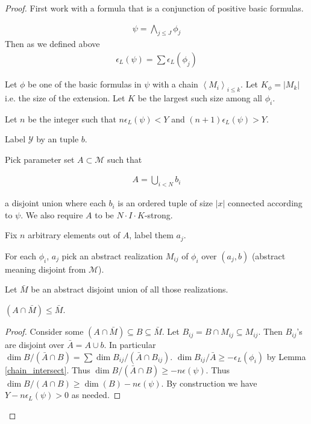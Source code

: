 \documentclass{amsart}
\newcommand{\MM}{\mathscr M}
\newcommand{\Y}{\mathcal Y}
\newcommand{\agl}[1]{\left\langle #1 \right\rangle}
\begin{document}
\begin{proof}
	First work with a formula that is a conjunction of positive basic formulas.

	\begin{align*}
		\psi = \bigwedge_{j \leq J} \phi_j
	\end{align*}
	Then as we defined above
	\begin{align*}
		\epsilon_L(\psi) = \sum \epsilon_L(\phi_j)
	\end{align*}
	
	Let $\phi$ be one of the basic formulas in $\psi$ with a chain $\agl{M_i}_{i \leq k}$.
	Let $K_\phi = |M_k|$ i.e. the size of the extension.
	Let $K$ be the largest such size among all $\phi_i$.

	Let $n$ be the integer such that $n \epsilon_L(\psi) < Y$ and $(n+1) \epsilon_L(\psi) > Y$.

	Label $\Y$ by an tuple $b$.

	Pick parameter set $A \subset \MM$ such that 

	\begin{align*}
		A = \bigcup_{i<N} b_i
	\end{align*}

	a disjoint union where each $b_i$ is an ordered tuple of size $|x|$ connected according to $\psi$.
	We also require $A$ to be $N \cdot I \cdot K$-strong.

	Fix $n$ arbitrary elements out of $A$, label them $a_j$.

	For each $\phi_i$, $a_j$ pick an abstract realization $M_{ij}$ of $\phi_i$ over $(a_j, b)$
	(abstract meaning disjoint from $\MM$).
	
	Let $\bar M$ be an abstract disjoint union of all those realizations.

	\begin{Claim}
		$(A \cap \bar M) \leq \bar M$.
	\end{Claim}
	\begin{proof}
		Consider some $(A \cap \bar M) \subseteq B \subseteq \bar M$.
		Let $B_{ij} = B \cap M_{ij} \subseteq M_{ij}$.
		Then $B_{ij}$'s are disjoint over $\bar A = A \cup b$.
		In particular $\dim B / (\bar A \cap B) = \sum \dim B_{ij} / (\bar A \cap B_{ij})$.
		$\dim B_{ij} / \bar A \geq -\epsilon_L(\phi_i)$ by Lemma \ref{chain_intersect}.
		Thus $\dim B / (\bar A \cap B) \geq -n\epsilon(\psi)$.
		Thus $\dim B / (A \cap B) \geq \dim(B) - n\epsilon(\psi)$.
		By construction we have $Y - n\epsilon_L(\psi) > 0$ as needed.
	\end{proof}


\end{proof}
\end{document}
